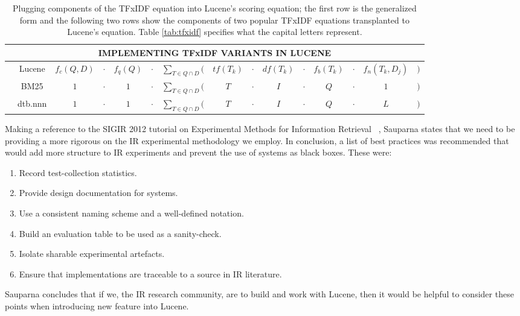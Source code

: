 \begin{table}[bht!]
	\small
  \centering
  \begin{tabular}{lcccccccccccccc}
    \multicolumn{15}{c}{IMPLEMENTING TFxIDF VARIANTS IN LUCENE}
    \\
    \hline\hline

    & Lucene  & $f_{c}(Q,D)$     & $\cdot$ & $f_{q}(Q)$
    & $\cdot$ & $\displaystyle\sum_{T \in Q \cap D}($     & $tf(T_{k})$
    & $\cdot$ & $df(T_{k})$      & $\cdot$ & $f_{b}(T_{k})$
    & $\cdot$ & $f_{n}(T_{k}, D_{j})$      & $)$ \\
    
    & BM25    & $1$              &  $\cdot$ & $1$
    & $\cdot$ & $\displaystyle\sum_{T \in Q \cap D}($      & $T$
    & $\cdot$ & $I$              & $\cdot$  & $Q$
    & $\cdot$ & $1$              & $)$ \\

    & dtb.nnn & $1$              & $\cdot$ & $1$
    & $\cdot$ & $\displaystyle\sum_{T \in Q \cap D}($     & $T$
    & $\cdot$ & $I$              & $\cdot$ & $Q$
    & $\cdot$ & $L$              & $)$ \\

    \hline\hline
  \end{tabular}

  \caption{Plugging components of the TFxIDF equation into Lucene's
    scoring equation; the first row is the generalized form and the
    following two rows show the components of two popular TFxIDF
    equations transplanted to Lucene's equation. Table
    \ref{tab:tfxidf} specifies what the capital letters represent.}

  \label{tab:lucene}

\end{table}


Making a reference to the SIGIR 2012 tutorial on Experimental
Methods for Information Retrieval
~\cite{Metzler:2012:EMI:2348283.2348534}, Sauparna states that we need to be providing a more rigorous on the IR experimental methodology we employ. In conclusion, a list of best practices was recommended that would add more structure to IR experiments and prevent the use of systems as black boxes. These were:

\begin{enumerate}

\item Record test-collection statistics.

\item Provide design documentation for systems.

\item Use a consistent naming scheme and a well-defined notation.

\item Build an evaluation table to be used as a sanity-check.

\item Isolate sharable experimental artefacts.

\item Ensure that implementations are traceable to a source in IR
  literature.
\end{enumerate}

Sauparna concludes that if we, the IR research community, are to build and work with Lucene, then it would be helpful to consider these points when introducing new feature into Lucene.


